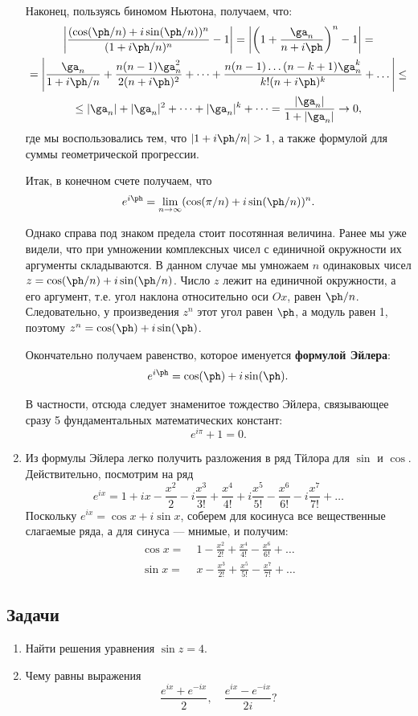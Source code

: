 \begin{enumerate}
Наконец, пользуясь биномом Ньютона, получаем, что:
\begin{gather*}
\left|\frac{(\cos(\ph/n)+i\sin(\ph/n))^n}{(1+i\ph/n)^n}-1\right| = \left|\left(1+\frac{\ga_n}{n+i\ph}\right)^n-1\right| = \\
= \left|\frac{\ga_n}{1+i\ph/n} + \frac{n(n-1)\ga_n^2}{2(n+i\ph)^2} + \dots + 
\frac{n(n-1)\dots(n-k+1)\ga_n^k}{k!(n+i\ph)^k} + \dots \right| \le \\
\le |\ga_n| + |\ga_n|^2 + \dots + |\ga_n|^k + \dots = \frac{|\ga_n|}{1+|\ga_n|} \to 0,
\end{gather*}
где мы воспользовались тем, что $|1+i\ph/n|>1$, а также формулой для суммы геометрической прогрессии.

Итак, в конечном счете получаем, что
$$
e^{i\ph} = \lim_{n\to\infty}(\cos(\pi/n)+i\sin(\ph/n))^n.
$$

Однако справа под знаком предела стоит посотянная величина. Ранее мы уже видели, что при умножении комплексных чисел с единичной окружности их аргументы складываются. В данном случае мы умножаем $n$ одинаковых чисел $z=\cos(\ph/n)+i\sin(\ph/n)$. Число $z$ лежит на единичной окружности, а его аргумент, т.е. угол наклона относительно оси $Ox$, равен $\ph/n$. Следовательно, у произведения $z^n$ этот угол равен $\ph$, а модуль равен 1, поэтому $z^n=\cos(\ph)+i\sin(\ph)$.

Окончательно получаем равенство, которое именуется \textbf{формулой Эйлера}:
$$
e^{i\ph} = \cos(\ph)+i\sin(\ph).
$$

В частности, отсюда следует знаменитое тождество Эйлера, связывающее сразу 5 фундаментальных математических констант:
$$
e^{i\pi}+1=0.
$$

\item Из формулы Эйлера легко получить разложения в ряд Тйлора для $\sin$ и $\cos$. Действительно, посмотрим на ряд
$$
e^{ix} = 1 + ix - \frac{x^2}{2} - i\frac{x^3}{3!} + \frac{x^4}{4!} + i\frac{x^5}{5!} - \frac{x^6}{6!} - i\frac{x^7}{7!}+\dots
$$
Поскольку $e^{ix}=\cos x+i\sin x$, соберем для косинуса все вещественные слагаемые ряда, а для синуса --- мнимые, и получим:
\begin{align*}
\cos x = & \;1 - \frac{x^2}{2!} + \frac{x^4}{4!} - \frac{x^6}{6!} + \dots \\
\sin x = &\; x - \frac{x^3}{2!} + \frac{x^5}{5!} - \frac{x^7}{7!} + \dots
\end{align*}
\end{enumerate}



\subsection*{Задачи}
\begin{enumerate}
\item Найти решения уравнения $\sin z=4$.
\item Чему равны выражения
$$
\frac{e^{ix}+e^{-ix}}{2},\quad \frac{e^{ix}-e^{-ix}}{2i}?
$$
\end{enumerate}


